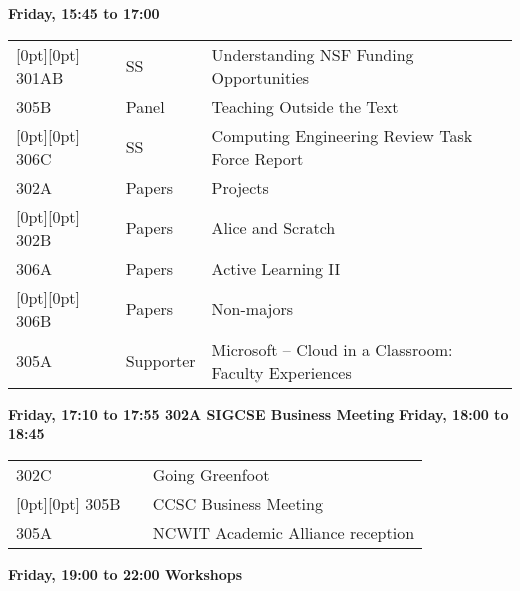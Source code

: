 \noindent
{\sffamily\bfseries Friday, 15:45 to 17:00}\newline\noindent
\begin{tabular*}{5in}{@{}p{0.5in}@{}p{0.75in}@{}p{3.75in}}

\rowcolor[gray]{0.9}[0pt][0pt] 301AB & SS & Understanding NSF Funding Opportunities \\

305B & Panel & Teaching Outside the Text \\

\rowcolor[gray]{0.9}[0pt][0pt] 306C & SS & Computing Engineering Review Task Force Report \\

302A & Papers & Projects \\

\rowcolor[gray]{0.9}[0pt][0pt] 302B & Papers & Alice and Scratch \\

306A & Papers & Active Learning II \\

\rowcolor[gray]{0.9}[0pt][0pt] 306B & Papers & Non-majors \\

305A & Supporter & Microsoft --  Cloud in a Classroom:  Faculty Experiences 
\end{tabular*}
\noindent
{\sffamily\bfseries Friday, 17:10 to 17:55 302A SIGCSE Business Meeting}\newline\noindent
\noindent
{\sffamily\bfseries Friday, 18:00 to 18:45 }\newline\noindent
\begin{tabular*}{5in}{@{}p{0.5in}@{}p{0.75in}@{}p{3.75in}}

302C &  & Going Greenfoot \\
\rowcolor[gray]{0.9}[0pt][0pt] 305B &  & CCSC Business Meeting \\
305A &  & NCWIT Academic Alliance reception \\
\end{tabular*}
\noindent
{\sffamily\bfseries Friday, 19:00 to 22:00 Workshops}\newline\noindent

